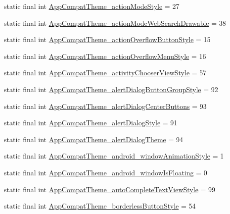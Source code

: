 \begin{DoxyCompactItemize}
\item 
static final int \hyperlink{classproject4_1_1xaria_1_1R_1_1styleable_aa1cbbb6e6f07e19dfc6810cf2e89f0f0}{App\+Compat\+Theme\+\_\+action\+Mode\+Style} = 27
\item 
static final int \hyperlink{classproject4_1_1xaria_1_1R_1_1styleable_a018f76fc0960147c4ef1591a74a324cc}{App\+Compat\+Theme\+\_\+action\+Mode\+Web\+Search\+Drawable} = 38
\item 
static final int \hyperlink{classproject4_1_1xaria_1_1R_1_1styleable_abb732edffcf1b36c734cb674eb0a4092}{App\+Compat\+Theme\+\_\+action\+Overflow\+Button\+Style} = 15
\item 
static final int \hyperlink{classproject4_1_1xaria_1_1R_1_1styleable_a51ca3492a0dc1ccc3966dd4a59665a62}{App\+Compat\+Theme\+\_\+action\+Overflow\+Menu\+Style} = 16
\item 
static final int \hyperlink{classproject4_1_1xaria_1_1R_1_1styleable_ad55044cb99752002455670fa3f2f4a28}{App\+Compat\+Theme\+\_\+activity\+Chooser\+View\+Style} = 57
\item 
static final int \hyperlink{classproject4_1_1xaria_1_1R_1_1styleable_acb4a414bfb83d9548273fc395f7089bd}{App\+Compat\+Theme\+\_\+alert\+Dialog\+Button\+Group\+Style} = 92
\item 
static final int \hyperlink{classproject4_1_1xaria_1_1R_1_1styleable_a5c8e6a4235c2c98dfbe58c9c3156e38a}{App\+Compat\+Theme\+\_\+alert\+Dialog\+Center\+Buttons} = 93
\item 
static final int \hyperlink{classproject4_1_1xaria_1_1R_1_1styleable_aad7f2a212de4bf58ca6cc476eab41d07}{App\+Compat\+Theme\+\_\+alert\+Dialog\+Style} = 91
\item 
static final int \hyperlink{classproject4_1_1xaria_1_1R_1_1styleable_a5721980038eb99ff7b34164c0824b0f6}{App\+Compat\+Theme\+\_\+alert\+Dialog\+Theme} = 94
\item 
static final int \hyperlink{classproject4_1_1xaria_1_1R_1_1styleable_a9cd010ea2199c7b2d3343acea12f21ce}{App\+Compat\+Theme\+\_\+android\+\_\+window\+Animation\+Style} = 1
\item 
static final int \hyperlink{classproject4_1_1xaria_1_1R_1_1styleable_a82f0023ac5cdc68430cb09e5f9ca2633}{App\+Compat\+Theme\+\_\+android\+\_\+window\+Is\+Floating} = 0
\item 
static final int \hyperlink{classproject4_1_1xaria_1_1R_1_1styleable_a7608aea43314e12bc4f420fc021aac72}{App\+Compat\+Theme\+\_\+auto\+Complete\+Text\+View\+Style} = 99
\item 
static final int \hyperlink{classproject4_1_1xaria_1_1R_1_1styleable_ae837237fac21a2cede4731aba76d2506}{App\+Compat\+Theme\+\_\+borderless\+Button\+Style} = 54

\end{DoxyCompactItemize}
